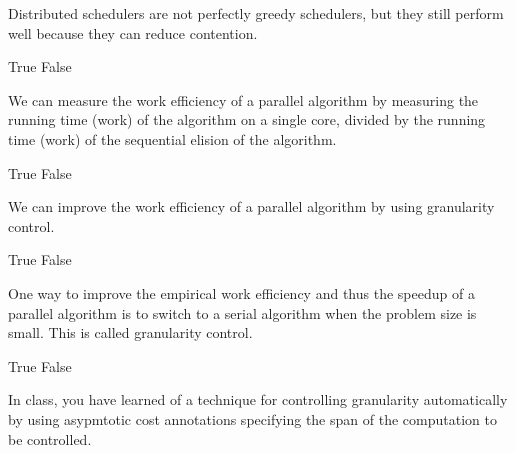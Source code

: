 \begin{cluster}
\begin{parts}
\begin{problem}
Distributed schedulers are not perfectly greedy schedulers, but they
still perform well because they can reduce contention. 

\begin{pickone}
\correctchoice True
\choice False
\end{pickone}


\end{problem}


\begin{problem}[2]

We can measure the work efficiency of a parallel algorithm by
measuring the running time (work) of the algorithm on a single core,
divided by the running time (work) of the sequential elision of the
algorithm.

\begin{pickone}
\choice True
\correctchoice False
\end{pickone}

\end{problem}
 


\begin{problem}[2]

We can improve the work efficiency of a parallel algorithm by using
granularity control.

\begin{pickone}
\correctchoice True
\choice False
\end{pickone}


\end{problem}

\begin{problem}[2]
One way to improve the empirical work efficiency and thus the speedup
of a parallel algorithm is to switch to a serial algorithm when the
problem size is small. This is called granularity control.


\begin{pickone}
\correctchoice True
\choice False
\end{pickone}

\end{problem}

\begin{problem}[2]

In class, you have learned of a technique for controlling granularity
automatically by using asypmtotic cost annotations specifying the span
of the  computation to be controlled.



\end{problem}
\end{parts}
\end{cluster}
